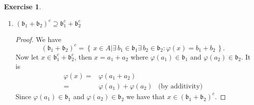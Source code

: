 \documentclass{book}
\theoremstyle{plain}
\theoremstyle{definition}
\newtheorem{exr}[thm]{Exercise}
\theoremstyle{custom_definition}
\newcommand{\makeset}[2]{\left\{\, #1 \mathrel{\Big|} #2 \,\right\}}
\begin{document}
\begin{exr}
\begin{enumerate}
\begin{proof}
      I think the above proof should work into both directions.
    \end{proof}
    \item \((\mathfrak{b}_1 + \mathfrak{b}_2)^c \supseteq \mathfrak{b}_1^c + \mathfrak{b}_2^c\)
    \begin{proof}
      We have
      \begin{equation}
        (\mathfrak{b}_1 + \mathfrak{b}_2)^c = \makeset{x \in A}{\exists \, b_1 \in \mathfrak{b}_1 \exists \, b_2 \in \mathfrak{b}_2 : \varphi(x) = b_1 + b_2} \text{.}
      \end{equation}
      Now let \(x \in \mathfrak{b}_1^c + \mathfrak{b}_2^c\), then \(x = a_1 + a_2\) where \(\varphi(a_1) \in \mathfrak{b}_1\) and \(\varphi(a_2) \in \mathfrak{b}_2\). It is
      \begin{align}
        \varphi(x) =& \varphi(a_1 + a_2) & \\
        =& \varphi(a_1) + \varphi(a_2) & \text{(by additivity)}
      \end{align}
      Since \(\varphi(a_1) \in \mathfrak{b}_1\) and \(\varphi(a_2) \in \mathfrak{b}_2\) we have that \(x \in (\mathfrak{b}_1 + \mathfrak{b}_2)^c\).
    \end{proof}
  \end{enumerate}
\end{exr}
\end{document}
